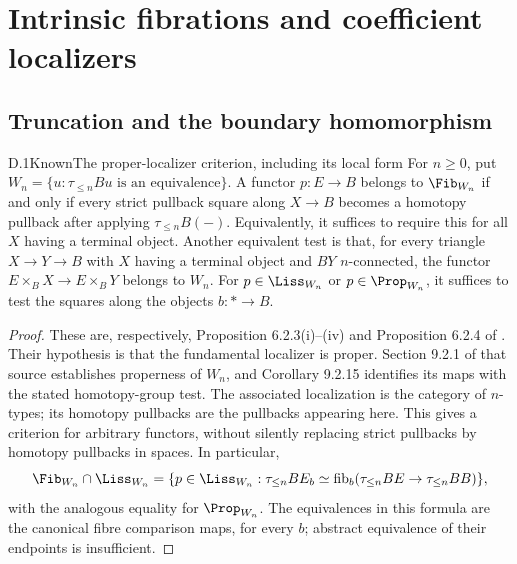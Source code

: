 \section{Intrinsic fibrations and coefficient localizers}
\subsection{Truncation and the boundary homomorphism}
\begin{claim}{D.1}{Known}{The proper-localizer criterion, including its local form}
For $n\geq0$, put $W_n=\{u:\tau_{\leq n}Bu\text{ is an equivalence}\}$. A functor $p:E\to B$ belongs to $\Fib_{W_n}$ if and only if every strict pullback square along $X\to B$ becomes a homotopy pullback after applying $\tau_{\leq n}B(-)$. Equivalently, it suffices to require this for all $X$ having a terminal object. Another equivalent test is that, for every triangle $X\to Y\to B$ with $X$ having a terminal object and $BY$ $n$-connected, the functor $E\times_BX\to E\times_BY$ belongs to $W_n$. For $p\in\Liss_{W_n}$ or $p\in\Prop_{W_n}$, it suffices to test the squares along the objects $b:*\to B$.
\end{claim}
\begin{proof}
These are, respectively, Proposition 6.2.3(i)--(iv) and Proposition 6.2.4 of \citet{RCisinski2006}. Their hypothesis is that the fundamental localizer is proper. Section 9.2.1 of that source establishes properness of $W_n$, and Corollary 9.2.15 identifies its maps with the stated homotopy-group test. The associated localization is the category of $n$-types; its homotopy pullbacks are the pullbacks appearing here. This gives a criterion for arbitrary functors, without silently replacing strict pullbacks by homotopy pullbacks in spaces. In particular,
\[
\Fib_{W_n}\cap\Liss_{W_n}
 =\{p\in\Liss_{W_n}:\tau_{\leq n}BE_b\simeq
 \operatorname{fib}_b(\tau_{\leq n}BE\to\tau_{\leq n}BB)\},
\]
with the analogous equality for $\Prop_{W_n}$. The equivalences in this formula are the canonical fibre comparison maps, for every $b$; abstract equivalence of their endpoints is insufficient.
\end{proof}

